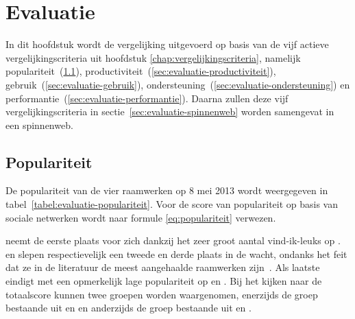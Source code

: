 \chapter{Evaluatie}
\label{chap:evaluatie}

In dit hoofdstuk wordt de vergelijking uitgevoerd op basis van de vijf actieve vergelijkingscriteria uit hoofdstuk \ref{chap:vergelijkingscriteria}, namelijk populariteit~(\ref{sec:evaluatie-populariteit}), productiviteit~(\ref{sec:evaluatie-productiviteit}), gebruik~(\ref{sec:evaluatie-gebruik}), ondersteuning~(\ref{sec:evaluatie-ondersteuning}) en performantie~(\ref{sec:evaluatie-performantie}). 
Daarna zullen deze vijf vergelijkingscriteria in sectie~\ref{sec:evaluatie-spinnenweb} worden samengevat in een spinnenweb.


\section{Populariteit} %
\label{sec:evaluatie-populariteit}

De populariteit van de vier raamwerken op 8 mei 2013 wordt weergegeven in tabel~\ref{tabel:evaluatie-populariteit}. 
Voor de score van populariteit op basis van sociale netwerken wordt naar formule \ref{eq:populariteit} verwezen.

\begin{table}
\centering
{}
\caption{Overzicht van populariteit op 8 mei 2013.}
\label{tabel:evaluatie-populariteit}
\end{table}

\kendo{} neemt de eerste plaats voor zich dankzij het zeer groot aantal vind-ik-leuks op \fb.
\jqm{} en \st{} slepen respectievelijk een tweede en derde plaats in de wacht, ondanks het feit dat ze in de literatuur de meest aangehaalde raamwerken zijn~\cite{David2011,Firtman2013,Hales2012,Oeflman2011}. 
Als laatste eindigt \lungo{} met een opmerkelijk lage populariteit op \so{} en \fb.
Bij het kijken naar de totaalscore kunnen twee groepen worden waargenomen, enerzijds de groep bestaande uit \kendo{} en \jqm{} en anderzijds de groep bestaande uit \st{} en \lungo{}.

